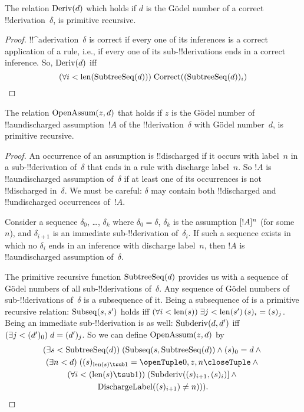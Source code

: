 \documentclass[../../../include/open-logic-section]{subfiles}
\begin{document}
\begin{prop}
  The relation $\mathrm{Deriv}(d)$ which holds if $d$ is the G\"odel
  number of a correct !!{derivation}~$\delta$, is primitive recursive.
\end{prop}

\begin{proof}
  !!^a{derivation}~$\delta$ is correct if every one of its inferences
  is a correct application of a rule, i.e., if every one of its
  sub-!!{derivation}s ends in a correct inference. So, $\mathrm{Deriv}(d)$
  iff
  \[
  (\forall i<\mathrm{len}(\mathrm{SubtreeSeq}(d)))\; \mathrm{Correct}((\mathrm{SubtreeSeq}(d))_i)
  \]
\end{proof}

\begin{prop}
   The relation $\mathrm{OpenAssum}(z, d)$ that
  holds if $z$ is the G\"odel number of !!a{undischarged} assumption~$!A$
  of the !!{derivation}~$\delta$ with G\"odel number~$d$, is primitive
  recursive.
\end{prop}

\begin{proof}
  An occurrence of an assumption is !!{discharged} if it occurs with
  label~$n$ in a sub-!!{derivation} of~$\delta$ that ends in a rule
  with discharge label~$n$. So $!A$ is !!a{undischarged} assumption
  of~$\delta$ if at least one of its occurrences is not !!{discharged}
  in~$\delta$. We must be careful: $\delta$ may contain both
  !!{discharged} and !!{undischarged} occurrences of~$!A$.

  Consider a sequence $\delta_0$, \dots, $\delta_k$ where $\delta_0 =
  \delta$, $\delta_k$ is the assumption $[!A]^{n}$
  (for some~$n$), and $\delta_{i+1}$ is an immediate sub-!!{derivation}
  of~$\delta_i$. If such a sequence exists in which no $\delta_i$
  ends in an inference with discharge label~$n$, then $!A$ is
  !!a{undischarged} assumption of~$\delta$.

  The primitive recursive function $\mathrm{SubtreeSeq}(d)$ provides us
  with a sequence of G\"odel numbers of all sub-!!{derivation}s
  of~$\delta$. Any sequence of G\"odel numbers of sub-!!{derivation}s
  of~$\delta$ is a subsequence of it. Being a subsequence of is a
  primitive recursive relation: $\mathrm{Subseq}(s, s')$ holds iff
  $\bforall{i<\len{s}}{\lexists[j<\len{s'}][(s)_i = (s)_j]}$. Being an
  immediate sub-!!{derivation} is as well: $\mathrm{Subderiv}(d, d')$ iff
  $(\exists j<(d')_0)\; d = (d')_j$. So we can define
  $\mathrm{OpenAssum}(z, d)$ by
  \begin{multline*}
    \bexists{s<\fn{SubtreeSeq}(d)}{(\fn{Subseq}(s, \fn{SubtreeSeq}(d))
      \land (s)_0 = d \land {}} \\
    \bexists{n<d}{((s)_{\len{s} \tsub 1} = \tuple{0, z, n} \land {}}\\
      \bforall{i<(\len{s} \tsub 1)}{(\fn{Subderiv}((s)_{i+1}, (s)_i)] \land {}}\\
      \fn{DischargeLabel}((s)_{i+1}) \neq n))).
  \end{multline*}
\end{proof}
\end{document}
